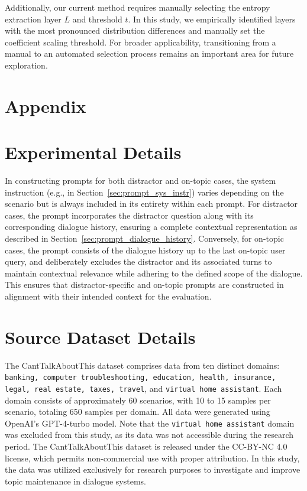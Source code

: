 \documentclass[11pt]{article}
\begin{document}
Additionally, our current method requires manually selecting the entropy extraction layer $L$ and threshold $t$. In this study, we empirically identified layers with the most pronounced distribution differences and manually set the coefficient scaling threshold. For broader applicability, transitioning from a manual to an automated selection process remains an important area for future exploration.



%


\appendix

\section*{Appendix}
\label{sec:appendix}
\section{Experimental Details}
In constructing prompts for both distractor and on-topic cases, the system instruction (e.g., in Section~\ref{sec:prompt_sys_instr}) varies depending on the scenario but is always included in its entirety within each prompt. For distractor cases, the prompt incorporates the distractor question along with its corresponding dialogue history, ensuring a complete contextual representation as described in Section~\ref{sec:prompt_dialogue_history}. Conversely, for on-topic cases, the prompt consists of the dialogue history up to the last on-topic user query, and deliberately excludes the distractor and its associated turns to maintain contextual relevance while adhering to the defined scope of the dialogue. This ensures that distractor-specific and on-topic prompts are constructed in alignment with their intended context for the evaluation.

\section{Source Dataset Details}\label{sec:detail_source}
The CantTalkAboutThis dataset comprises data from ten distinct domains: \texttt{banking, computer troubleshooting, education, health, insurance, legal, real estate, taxes, travel}, and \texttt{virtual home assistant}. Each domain consists of approximately 60 scenarios, with 10 to 15 samples per scenario, totaling 650 samples per domain. All data were generated using OpenAI's GPT-4-turbo model. Note that the \texttt{virtual home assistant} domain was excluded from this study, as its data was not accessible during the research period. The CantTalkAboutThis dataset is released under the CC-BY-NC 4.0 license, which permits non-commercial use with proper attribution. In this study, the data was utilized exclusively for research purposes to investigate and improve topic maintenance in dialogue systems.
\end{document}
